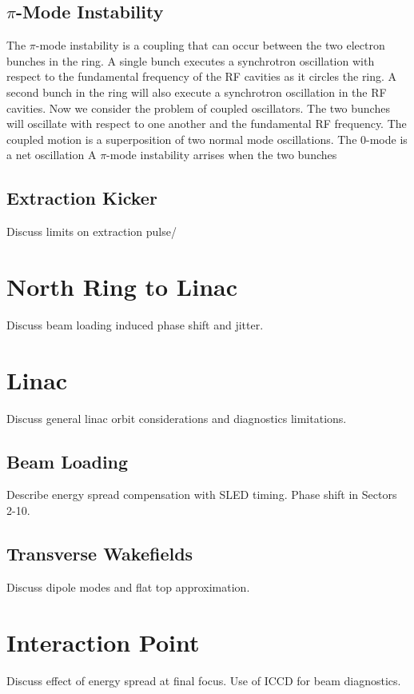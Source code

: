 \documentclass[aps,prl,preprint,groupedaddress]{revtex4-1}
\begin{document}
\subsection{$\pi$-Mode Instability}
The $\pi$-mode instability is a coupling that can occur between the two electron bunches in the ring. A single bunch executes a synchrotron oscillation with respect to the fundamental frequency of the RF cavities as it circles the ring. A second bunch in the ring will also execute a synchrotron oscillation in the RF cavities. Now we consider the problem of coupled oscillators. The two bunches will oscillate with respect to one another and the fundamental RF frequency. The coupled motion is a superposition of two normal mode oscillations. The 0-mode is a net oscillation  A $\pi$-mode instability arrises when the two bunches 

\subsection{Extraction Kicker}
Discuss limits on extraction pulse/

\section{North Ring to Linac}
Discuss beam loading induced phase shift and jitter.

\section{Linac}
Discuss general linac orbit considerations and diagnostics limitations.

\subsection{Beam Loading}
Describe energy spread compensation with SLED timing. Phase shift in Sectors 2-10.

\subsection{Transverse Wakefields}
Discuss dipole modes and flat top approximation.

\section{Interaction Point}
Discuss effect of energy spread at final focus. Use of ICCD for beam diagnostics.
\end{document}

